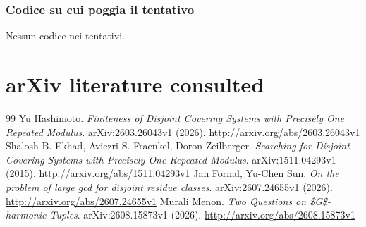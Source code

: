 \documentclass[11pt,a4paper]{article}
\begin{document}
\subsubsection{Codice su cui poggia il tentativo}
Nessun codice nei tentativi.

\section{arXiv literature consulted}
\begin{thebibliography}{99}
 Yu Hashimoto. \emph{Finiteness of Disjoint Covering Systems with Precisely One Repeated Modulus}. arXiv:2603.26043v1 (2026). \url{http://arxiv.org/abs/2603.26043v1}
 Shalosh B. Ekhad, Aviezri S. Fraenkel, Doron Zeilberger. \emph{Searching for Disjoint Covering Systems with Precisely One Repeated Modulus}. arXiv:1511.04293v1 (2015). \url{http://arxiv.org/abs/1511.04293v1}
 Jan Fornal, Yu-Chen Sun. \emph{On the problem of large gcd for disjoint residue classes}. arXiv:2607.24655v1 (2026). \url{http://arxiv.org/abs/2607.24655v1}
 Murali Menon. \emph{Two Questions on \$G\$-harmonic Tuples}. arXiv:2608.15873v1 (2026). \url{http://arxiv.org/abs/2608.15873v1}
\end{thebibliography}
\end{document}
